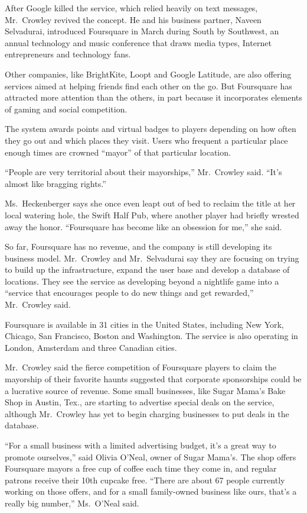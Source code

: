 ﻿\documentclass[12pt]{article}
\begin{document}
After Google killed the service, which relied heavily on text messages, Mr.~Crowley revived the
concept. He and his business partner, Naveen Selvadurai, introduced Foursquare in March during South
by Southwest, an annual technology and music conference that draws media types, Internet
entrepreneurs and technology fans.

Other companies, like BrightKite, Loopt and Google Latitude, are also offering services aimed at
helping friends find each other on the go. But Foursquare has attracted more attention than the
others, in part because it incorporates elements of gaming and social competition.

The system awards points and virtual badges to players depending on how often they go out and which
places they visit. Users who frequent a particular place enough times are crowned ``mayor'' of that
particular location.

``People are very territorial about their mayorships,'' Mr.~Crowley said. ``It's almost like
bragging rights.''

Ms.~Heckenberger says she once even leapt out of bed to reclaim the title at her local watering
hole, the Swift Half Pub, where another player had briefly wrested away the honor. ``Foursquare has
become like an obsession for me,'' she said.

So far, Foursquare has no revenue, and the company is still developing its business model.
Mr.~Crowley and Mr.~Selvadurai say they are focusing on trying to build up the infrastructure,
expand the user base and develop a database of locations. They see the service as developing beyond
a nightlife game into a ``service that encourages people to do new things and get rewarded,''
Mr.~Crowley said.

Foursquare is available in 31 cities in the United States, including New York, Chicago, San
Francisco, Boston and Washington. The service is also operating in London, Amsterdam and three
Canadian cities.

Mr.~Crowley said the fierce competition of Foursquare players to claim the mayorship of their
favorite haunts suggested that corporate sponsorships could be a lucrative source of revenue. Some
small businesses, like Sugar Mama's Bake Shop in Austin, Tex., are starting to advertise special
deals on the service, although Mr.~Crowley has yet to begin charging businesses to put deals in the
database.

``For a small business with a limited advertising budget, it's a great way to promote ourselves,''
said Olivia O'Neal, owner of Sugar Mama's. The shop offers Foursquare mayors a free cup of coffee
each time they come in, and regular patrons receive their 10th cupcake free. ``There are about 67
people currently working on those offers, and for a small family-owned business like ours, that's a
really big number,'' Ms.~O'Neal said.
\end{document}
